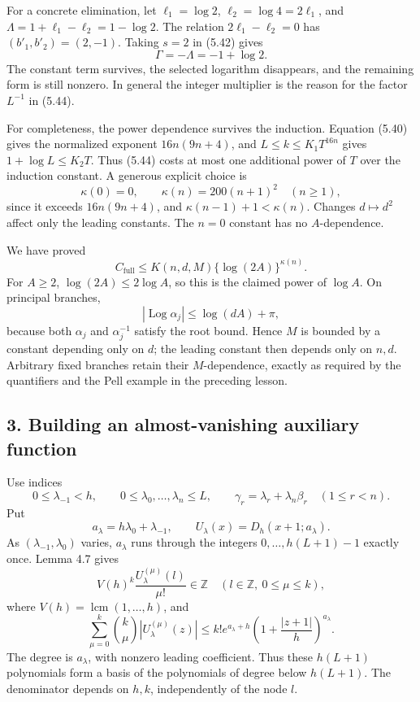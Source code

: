 \documentclass[
  11pt,
  a4paper,
]{article}
\begin{document}
For a concrete elimination, let \(\ell_1=\log2\),
\(\ell_2=\log4=2\ell_1\), and \(\Lambda=1+\ell_1-\ell_2=1-\log2\). The
relation \(2\ell_1-\ell_2=0\) has \((b'_1,b'_2)=(2,-1)\). Taking \(s=2\)
in (5.42) gives \[
\Gamma=-\Lambda=-1+\log2.
\] The constant term survives, the selected logarithm disappears, and
the remaining form is still nonzero. In general the integer multiplier
is the reason for the factor \(L^{-1}\) in (5.44).

For completeness, the power dependence survives the induction. Equation
(5.40) gives the normalized exponent \(16n(9n+4)\), and
\(L\le k\le K_1T^{16n}\) gives \(1+\log L\le K_2T\). Thus (5.44) costs
at most one additional power of \(T\) over the induction constant. A
generous explicit choice is \[
\kappa(0)=0,\qquad \kappa(n)=200(n+1)^2\quad(n\ge1), \tag{5.45}
\] since it exceeds \(16n(9n+4)\), and \(\kappa(n-1)+1<\kappa(n)\).
Changes \(d\mapsto d^2\) affect only the leading constants. The \(n=0\)
constant has no \(A\)-dependence.

We have proved \[
C_{\mathrm{full}}\le K(n,d,M)\{\log(2A)\}^{\kappa(n)}.
\] For \(A\ge2\), \(\log(2A)\le2\log A\), so this is the claimed power
of \(\log A\). On principal branches, \[
|\operatorname{Log}\alpha_j|
\le\log(dA)+\pi,
\] because both \(\alpha_j\) and \(\alpha_j^{-1}\) satisfy the root
bound. Hence \(M\) is bounded by a constant depending only on \(d\); the
leading constant then depends only on \(n,d\). Arbitrary fixed branches
retain their \(M\)-dependence, exactly as required by the quantifiers
and the Pell example in the preceding lesson.

\subsection{3. Building an almost-vanishing auxiliary
function}\label{building-an-almost-vanishing-auxiliary-function}

Use indices \[
0\le\lambda_{-1}<h,\qquad 0\le\lambda_0,\ldots,\lambda_n\le L,
\qquad \gamma_r=\lambda_r+\lambda_n\beta_r\quad(1\le r<n).
\] Put \[
a_\lambda=h\lambda_0+\lambda_{-1},\qquad
U_\lambda(x)=D_h(x+1;a_\lambda).
\] As \((\lambda_{-1},\lambda_0)\) varies, \(a_\lambda\) runs through
the integers \(0,\ldots,h(L+1)-1\) exactly once. Lemma 4.7 gives \[
V(h)^k\frac{U_\lambda^{(\mu)}(l)}{\mu!}\in\mathbb Z
\quad(l\in\mathbb Z,\ 0\le\mu\le k),
\] where \(V(h)=\operatorname{lcm}(1,\ldots,h)\), and \[
\sum_{\mu=0}^k\binom{k}{\mu}|U_\lambda^{(\mu)}(z)|
\le k!e^{a_\lambda+h}
\left(1+\frac{|z+1|}{h}\right)^{a_\lambda}.
\] The degree is \(a_\lambda\), with nonzero leading coefficient. Thus
these \(h(L+1)\) polynomials form a basis of the polynomials of degree
below \(h(L+1)\). The denominator depends on \(h,k\), independently of
the node \(l\).
\end{document}

